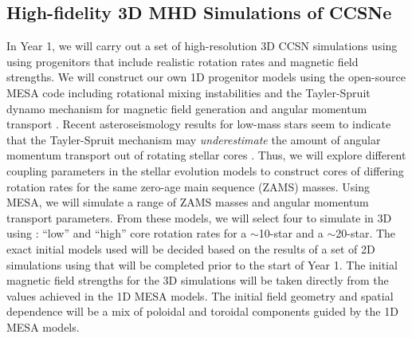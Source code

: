 \vspace{0.1in} 

\subsection{High-fidelity 3D MHD Simulations of CCSNe}
\label{sec:Y1mrccsn}


In Year 1, we will carry out a set of high-resolution 3D CCSN simulations using \sparkmone using progenitors that include realistic rotation rates and magnetic field strengths.
We will construct our own 1D progenitor models using the open-source MESA code \citep{Paxton:2011, Paxton:2013, Paxton:2015} including rotational mixing instabilities and the Tayler-Spruit dynamo mechanism for magnetic field generation and angular momentum transport \citep{Spruit:2002, Heger:2005}.
Recent asteroseismology results for low-mass stars seem to indicate that the Tayler-Spruit mechanism may {\it underestimate} the amount of angular momentum transport out of rotating stellar cores \citep{Cantiello:2014}.
Thus, we will explore different coupling parameters in the stellar evolution models to construct cores of differing rotation rates for the same zero-age main sequence (ZAMS) masses.
Using MESA, we will simulate a range of ZAMS masses and angular momentum transport parameters.
From these models, we will select four to simulate in 3D using \sparkmone: ``low'' and ``high'' core rotation rates for a $\sim$10-\msun star and a $\sim$20-\msun star.
The exact initial models used will be decided based on the results of a set of 2D simulations using \sparkmone that will be completed prior to the start of Year 1.
The initial magnetic field strengths for the 3D simulations will be taken directly from the values achieved in the 1D MESA models.
The initial field geometry and spatial dependence will be a mix of poloidal and toroidal components guided by the 1D MESA models.

